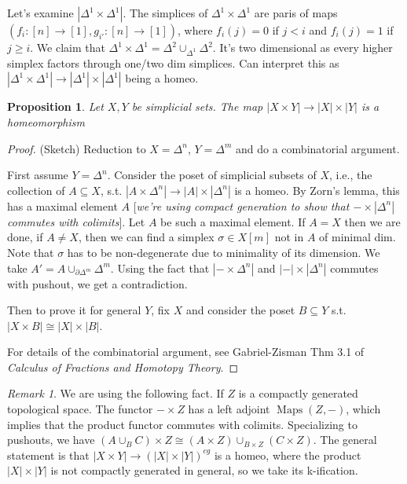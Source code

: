 \documentclass{article}
\theoremstyle{definition}
\theoremstyle{remark}
\newtheorem{rem}{Remark}
\theoremstyle{plain}
\newtheorem{prop}[defn]{Proposition}
\begin{document}
Let's examine $|\Delta^1\times\Delta^1|$. The simplices of $\Delta^1\times\Delta^1$ are paris of maps $(f_i:[n]\to[1],g_{i'}:[n]\to[1])$, where $f_i(j)=0$ if $j<i$ and $f_i(j)=1$ if $j\ge i$. We claim that $\Delta^1\times\Delta^1=\Delta^2\cup_{\Delta^1}\Delta^2$. It's two dimensional as every higher simplex factors through one/two dim simplices. Can interpret this as $|\Delta^1\times\Delta^1|\to|\Delta^1|\times|\Delta^1|$ being a homeo.
\begin{prop}
    Let $X,Y$ be simplicial sets. The map $|X\times Y|\to|X|\times|Y|$ is a homeomorphism
\end{prop}
\begin{proof}
    (Sketch)
    Reduction to $X=\Delta^n$, $Y=\Delta^m$ and do a combinatorial argument.

    First assume $Y=\Delta^n$. Consider the poset of simplicial subsets of $X$, i.e., the collection of $A\subseteq X$, s.t. $|A\times\Delta^n|\to|A|\times|\Delta^n|$ is a homeo. By Zorn's lemma, this has a maximal element $A$ [\textit{we're using compact generation to show that $-\times|\Delta^n|$ commutes with colimits}]. Let $A$ be such a maximal element. If $A=X$ then we are done, if $A\neq X$, then we can find a simplex $\sigma\in X[m]$ not in $A$ of minimal dim. Note that $\sigma$ has to be non-degenerate due to minimality of its dimension. We take $A'=A\cup_{\partial\Delta^m}\Delta^m$. Using the fact that $|-\times\Delta^n|$ and $|-|\times|\Delta^n|$ commutes with pushout, we get a contradiction.

    Then to prove it for general $Y$, fix $X$ and consider the poset $B\subseteq Y$ s.t. $|X\times B|\cong|X|\times |B|$. 

    For details of the combinatorial argument, see Gabriel-Zisman Thm 3.1 of \textit{Calculus of Fractions and Homotopy Theory}.
\end{proof}
\begin{rem}
    We are using the following fact. If $Z$ is a compactly generated topological space. The functor $-\times Z$ has a left adjoint $\operatorname{Maps}(Z,-)$, which implies that the product functor commutes with colimits. Specializing to pushouts, we have $(A\cup_B C)\times Z\cong (A\times Z)\cup_{B\times Z}(C\times Z)$. The general statement is that $|X\times Y|\to(|X|\times|Y|)^{cg}$ is a homeo, where the product $|X|\times |Y|$ is not compactly generated in general, so we take its k-ification.
\end{rem}
\end{document}
